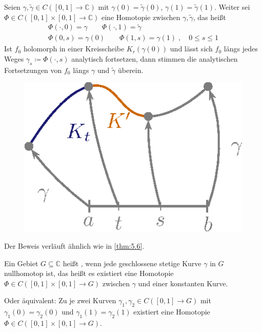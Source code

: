 \documentclass[a4paper,10pt]{scrbook}
\begin{document}
\begin{theorem}[Monodromiesatz] \label{thm:5.10}
  Seien $\gamma, \widetilde{\gamma} \in C([0,1] \to \mathbb{C})$ mit $\gamma(0) = \widetilde{\gamma}(0)$, $\gamma(1) = \widetilde{\gamma}(1)$. Weiter sei $\Phi \in C([0,1] \times [0,1] \to \mathbb{C})$ eine Homotopie zwischen $\gamma,\widetilde{\gamma}$, das heißt
  \begin{gather*}
    \Phi(\cdot,0) = \gamma \qquad \Phi(\cdot,1) = \widetilde{\gamma} \\
    \Phi(0,s) = \gamma(0) \qquad \Phi(1,s) = \gamma(1) \; , \quad 0 \leq s \leq 1
  \end{gather*}
  Ist $f_0$ holomorph in einer Kreisscheibe $K_r(\gamma(0))$ und lässt sich $f_0$ längs jedes Weges $\gamma_s \coloneq \Phi(\cdot,s)$ analytisch fortsetzen, dann stimmen die analytischen Fortsetzungen von $f_0$ längs $\gamma$ und $\widetilde{\gamma}$ überein.

  \begin{figure}[H]
    \centering
    \includegraphics[scale=0.2]{images/ana3-tmp-47}
  \end{figure}
  Der Beweis verläuft ähnlich wie in \ref{thm:5.6}.
\end{theorem}

\begin{theorem}[Definition]
  Ein Gebiet $G \subseteq \mathbb{C}$ heißt , wenn jede geschlossene stetige Kurve $\gamma$ in $G$ nullhomotop ist, das heißt es existiert eine Homotopie $\Phi \in C([0,1] \times [0,1] \to G)$ zwischen $\gamma$ und einer konstanten Kurve.

  Oder äquivalent: Zu je zwei Kurven $\gamma_1,\gamma_2 \in C([0,1] \to G)$ mit $\gamma_1(0) = \gamma_2(0)$ und $\gamma_1(1) = \gamma_2(1)$ existiert eine Homotopie $\Phi \in C([0,1] \times [0,1] \to G)$.
\end{theorem}
\end{document}
